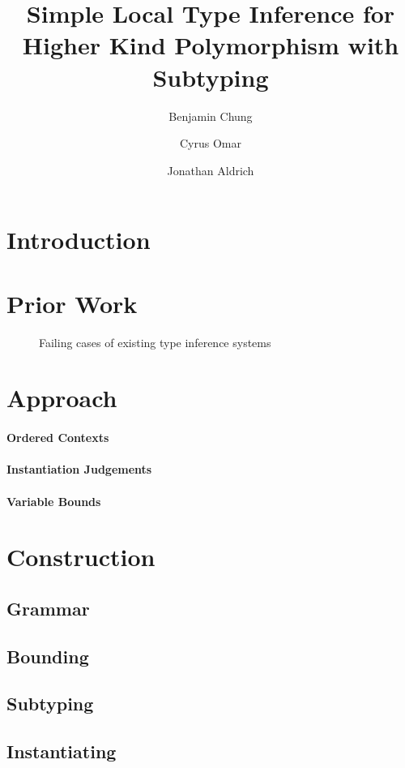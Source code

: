 \documentclass{llncs}
\title{Simple Local Type Inference for Higher Kind Polymorphism with Subtyping}
\author{Benjamin Chung\and Cyrus Omar \and Jonathan Aldrich}
\institute{\email{\{bwchung,comar,aldrich\}@cs.cmu.edu}\\Carnegie Mellon University}
\begin{document}
\maketitle
\begin{abstract}
\end{abstract}

\section{Introduction}
\section{Prior Work}

\begin{figure}

\label{fig:cons}
\caption{Failing cases of existing type inference systems}
\end{figure}

\section{Approach}
\paragraph{Ordered Contexts}
\paragraph{Instantiation Judgements}
\paragraph{Variable Bounds}


\section{Construction}
\subsection{Grammar}
\subsection{Bounding}
\subsection{Subtyping}
\subsection{Instantiating}
\end{document}
